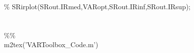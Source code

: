 \hspace{1mm}\hspace{5mm} \hspace{5mm} \hspace{5mm} \hspace{5mm} \hspace{5mm} \hspace{5mm} \hspace{5mm} \hspace{5mm} \textcolor{matlabgreen}{\% SRirplot(SRout.IRmed,VARopt,SRout.IRinf,SRout.IRsup); }\\ 
\hspace{1mm}\hspace{5mm} \hspace{5mm} \hspace{5mm} \hspace{5mm} \hspace{5mm} \hspace{5mm} \hspace{5mm} \hspace{5mm}  \\ 
\hspace{1mm}\hspace{5mm} \hspace{5mm} \hspace{5mm} \hspace{5mm} \hspace{5mm} \hspace{5mm} \hspace{5mm} \hspace{5mm}  \\ 
\hspace{1mm}\hspace{5mm} \hspace{5mm} \hspace{5mm} \hspace{5mm} \hspace{5mm} \hspace{5mm} \hspace{5mm} \hspace{5mm} \textcolor{matlabgreen}{\%}\textcolor{matlabgreen}{\% }\\ 
\hspace{1mm}\hspace{5mm} \hspace{5mm} \hspace{5mm} \hspace{5mm} \hspace{5mm} \hspace{5mm} \hspace{5mm} \hspace{5mm} m2tex(\textcolor{matlabpurple}{'VARToolbox\_Code.m'}) \\ 
